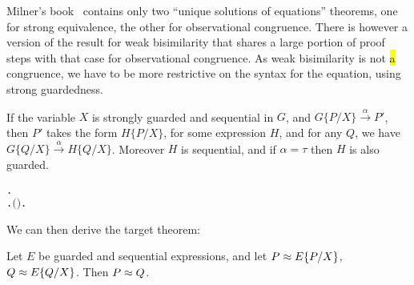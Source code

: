 Milner's book~\cite{Mil89} contains only two ``unique solutions of
equations'' theorems, one for strong equivalence, the other for
observational congruence.   There is however a
version  of the result for weak bisimilarity that shares a large portion of proof
steps with that case for observational congruence.  
As  weak bisimilarity 
 is not \hl{a} congruence, we have to be more restrictive on the syntax for
 the equation, using strong guardedness.
\begin{lemma}
If the variable $X$ is strongly guarded and sequential in $G$, and
$G\{P/X\}\overset{\alpha}{\rightarrow} P'$, then $P'$ takes the form
$H\{P/X\}$, for some expression $H$, and for any $Q$, we have
$G\{Q/X\}\overset{\alpha}{\rightarrow} H\{Q/X\}$. Moreover $H$ is
sequential, and if $\alpha = \tau$ then $H$ is also guarded.
\begin{alltt}
\HOLTokenTurnstile{}   \HOLSymConst{\HOLTokenConj{}}   \HOLSymConst{\HOLTokenImp{}}
   \HOLSymConst{\HOLTokenForall{}}  .
         \HOLTokenTransBegin{}\HOLTokenTransEnd {} \HOLSymConst{\HOLTokenImp{}}
       \HOLSymConst{\HOLTokenExists{}}.   \HOLSymConst{\HOLTokenConj{}} \ensuremath{(} \HOLSymConst{\ensuremath{=}} \HOLSymConst{\ensuremath{\tau}} \HOLSymConst{\HOLTokenImp{}}  \ensuremath{)} \HOLSymConst{\HOLTokenConj{}}  \HOLSymConst{\ensuremath{=}}   \HOLSymConst{\HOLTokenConj{}} \HOLSymConst{\HOLTokenForall{}}.   \HOLTokenTransBegin{}\HOLTokenTransEnd {} 
\end{alltt}
\end{lemma}

We can then derive the target theorem:
\begin{theorem}
Let $E$ be guarded and sequential expressions, and let $P \approx
E\{P/X\}$,
$Q \approx E\{Q/X\}$. Then $P \approx Q$.
\begin{alltt}
\HOLTokenTurnstile{}   \HOLSymConst{\HOLTokenConj{}}   \HOLSymConst{\HOLTokenConj{}}  \HOLSymConst{\HOLTokenWeakEQ}   \HOLSymConst{\HOLTokenConj{}}  \HOLSymConst{\HOLTokenWeakEQ}   \HOLSymConst{\HOLTokenImp{}}  \HOLSymConst{\HOLTokenWeakEQ} 
\end{alltt}
\end{theorem}

